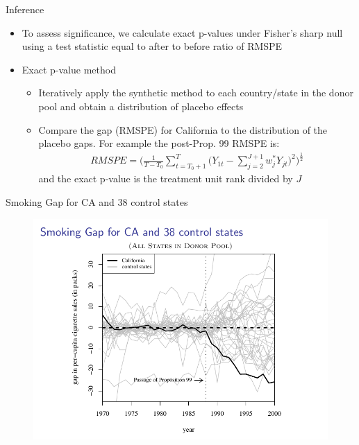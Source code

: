 \documentclass{beamer}
\begin{document}
\begin{frame}{Inference}
	
	\begin{itemize}
	\item To assess significance, we calculate exact p-values under Fisher's sharp null using a test statistic equal to after to before ratio of RMSPE
	\item Exact p-value method
		\begin{itemize}
		\item Iteratively apply the synthetic method to each country/state in the donor pool and obtain a distribution of placebo effects
		\item Compare the gap (RMSPE) for California to the distribution of the placebo gaps. For example the post-Prop. 99 RMSPE is: 
			\begin{eqnarray*}
			RMSPE = \bigg(\frac{1}{T-T_0} \sum_{t=T_0+1}^T \bigg(Y_{1t} - \sum_{j=2}^{J+1} w_j^* Y_{jt}\bigg)^2 \bigg)^{\frac{1}{2}}
			\end{eqnarray*}and the exact p-value is the treatment unit rank divided by $J$
		\end{itemize}
	\end{itemize}
\end{frame}

\begin{frame}{Smoking Gap for CA and 38 control states}
	
	\begin{figure}
	\includegraphics[scale=0.75]{./lecture_includes/abadie_7.pdf}
	\end{figure}
\end{frame}
\end{document}
